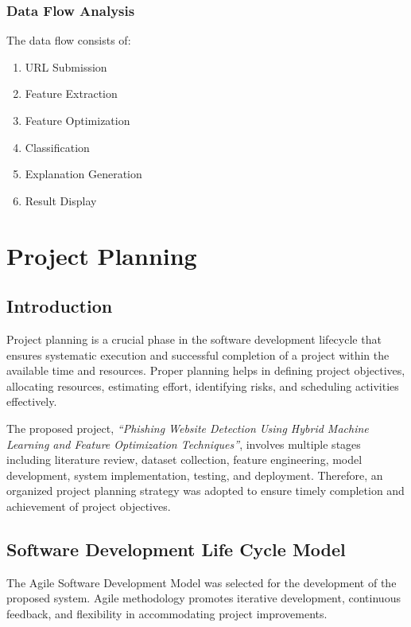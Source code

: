 \documentclass[12pt]{report}
\begin{document}
\subsection{Data Flow Analysis}

The data flow consists of:

\begin{enumerate}
    \item URL Submission
    \item Feature Extraction
    \item Feature Optimization
    \item Classification
    \item Explanation Generation
    \item Result Display
\end{enumerate}

\chapter{Project Planning}

\section{Introduction}

Project planning is a crucial phase in the software development lifecycle that ensures systematic execution and successful completion of a project within the available time and resources. Proper planning helps in defining project objectives, allocating resources, estimating effort, identifying risks, and scheduling activities effectively.

The proposed project, \textit{``Phishing Website Detection Using Hybrid Machine Learning and Feature Optimization Techniques''}, involves multiple stages including literature review, dataset collection, feature engineering, model development, system implementation, testing, and deployment. Therefore, an organized project planning strategy was adopted to ensure timely completion and achievement of project objectives.

\section{Software Development Life Cycle Model}

The Agile Software Development Model was selected for the development of the proposed system. Agile methodology promotes iterative development, continuous feedback, and flexibility in accommodating project improvements.
\end{document}
